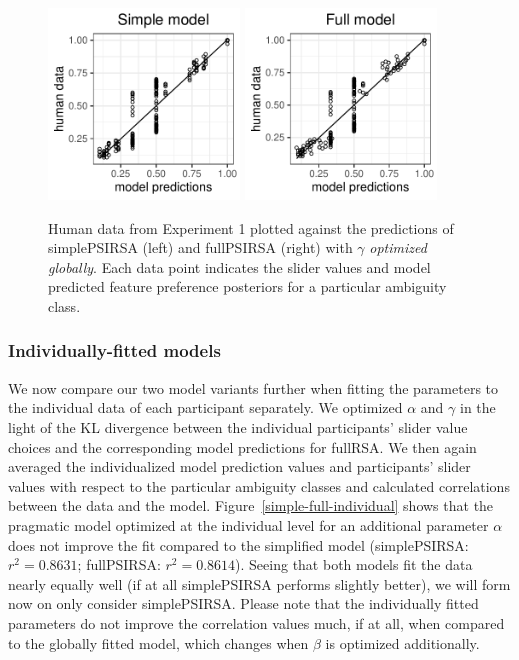 \documentclass[10pt,a4paper]{article}
\newcommand{\gcs}[1]{\textcolor{blue}{[gcs: #1]}}
\begin{document}
\begin{figure}[ht]
	\centering
	\includegraphics[width=2in]{images/m13.pdf}
	\includegraphics[width=2in]{images/m23.pdf}
	\caption{Human data from Experiment 1 plotted against the predictions of simplePSIRSA (left) and fullPSIRSA (right) with $\gamma$ \emph{optimized globally}. Each data point indicates the slider values and model predicted feature preference posteriors for a particular ambiguity class.}
		\label{simple-full}
\end{figure}


\subsubsection{Individually-fitted models}

We now compare our two model variants further when fitting the parameters to the individual data of each participant separately. 
We optimized $\alpha$ and $\gamma$ in the light of the KL divergence between the individual participants' slider value choices and the corresponding model predictions for fullRSA.
We then again averaged the individualized model prediction values and participants' slider values with respect to the particular ambiguity classes and calculated correlations between the data and the model.
Figure~\ref{simple-full-individual} shows that the pragmatic model optimized at the individual level for an additional parameter $\alpha$ does not improve the fit compared to the simplified model (simplePSIRSA: $r^{2}=0.8631$; fullPSIRSA: $r^{2}=0.8614$). 
Seeing that both models fit the data nearly equally well (if at all simplePSIRSA performs slightly better), we will form now on only consider simplePSIRSA.
Please note that the individually fitted parameters do not improve the correlation values much, if at all, when compared to the globally fitted model, which changes when $\beta$ is optimized additionally.
\end{document}
